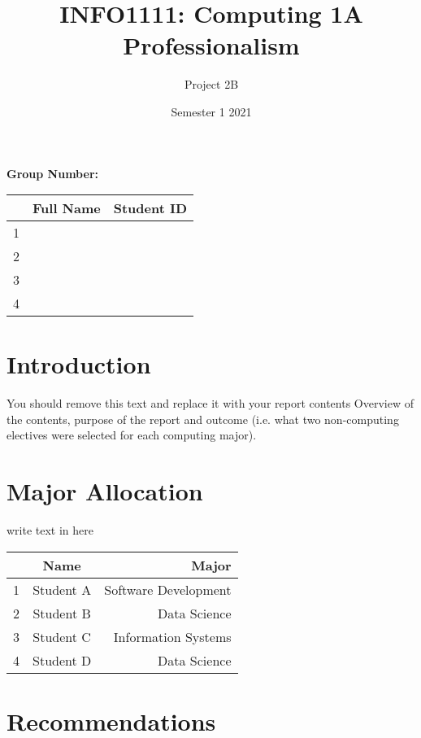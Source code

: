 \documentclass[12pt]{article}
\title{INFO1111: Computing 1A Professionalism}
\date{Semester 1 2021}
\author{Project 2B}
\begin{document}
\maketitle

\begin{center}
    \textbf{Group Number:}
\end{center}

\begin{center}
\begin{tabular}{|l|c|r|}
\hline
  & Full Name & Student ID \\ \hline
1 &           &            \\ \hline
2 &           &            \\ \hline
3 &           &            \\ \hline
4 &           &            \\ \hline
\end{tabular}
\end{center}
\thispagestyle{empty}
\newpage

\setcounter{page}{1}
\section{Introduction}
You should remove this text and replace it with your report contents
Overview of the contents, purpose of the report and outcome (i.e. what two non-computing electives were selected for each computing major).


\section{Major Allocation}
write text in here
\begin{center}
\begin{tabular}{|l|c|r|}
\hline
  & Name      & Major                \\ \hline
1 & Student A & Software Development \\ \hline
2 & Student B & Data Science        \\ \hline
3 & Student C & Information Systems  \\ \hline
4 & Student D & Data Science         \\ \hline
\end{tabular}
\end{center}

\section{Recommendations}
\end{document}
